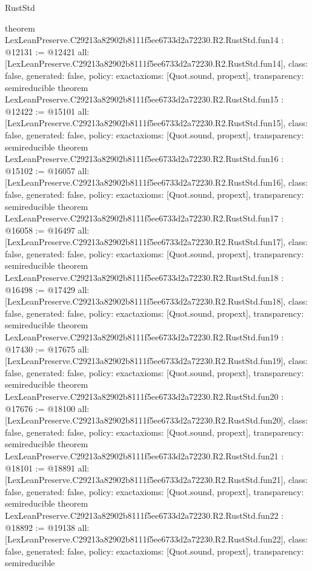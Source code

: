 \begin{lexlean}{RustStd}
\begin{coremodule}
{}
theorem LexLeanPreserve.C29213a82902b8111f5ee6733d2a72230.R2.RustStd.fun14 : @12131 := @12421 {
  all: [LexLeanPreserve.C29213a82902b8111f5ee6733d2a72230.R2.RustStd.fun14],
  class: false,
  generated: false,
  policy: exact{axioms: [Quot.sound, propext]},
  transparency: semireducible
}
theorem LexLeanPreserve.C29213a82902b8111f5ee6733d2a72230.R2.RustStd.fun15 : @12422 := @15101 {
  all: [LexLeanPreserve.C29213a82902b8111f5ee6733d2a72230.R2.RustStd.fun15],
  class: false,
  generated: false,
  policy: exact{axioms: [Quot.sound, propext]},
  transparency: semireducible
}
theorem LexLeanPreserve.C29213a82902b8111f5ee6733d2a72230.R2.RustStd.fun16 : @15102 := @16057 {
  all: [LexLeanPreserve.C29213a82902b8111f5ee6733d2a72230.R2.RustStd.fun16],
  class: false,
  generated: false,
  policy: exact{axioms: [Quot.sound, propext]},
  transparency: semireducible
}
theorem LexLeanPreserve.C29213a82902b8111f5ee6733d2a72230.R2.RustStd.fun17 : @16058 := @16497 {
  all: [LexLeanPreserve.C29213a82902b8111f5ee6733d2a72230.R2.RustStd.fun17],
  class: false,
  generated: false,
  policy: exact{axioms: [Quot.sound, propext]},
  transparency: semireducible
}
theorem LexLeanPreserve.C29213a82902b8111f5ee6733d2a72230.R2.RustStd.fun18 : @16498 := @17429 {
  all: [LexLeanPreserve.C29213a82902b8111f5ee6733d2a72230.R2.RustStd.fun18],
  class: false,
  generated: false,
  policy: exact{axioms: [Quot.sound, propext]},
  transparency: semireducible
}
theorem LexLeanPreserve.C29213a82902b8111f5ee6733d2a72230.R2.RustStd.fun19 : @17430 := @17675 {
  all: [LexLeanPreserve.C29213a82902b8111f5ee6733d2a72230.R2.RustStd.fun19],
  class: false,
  generated: false,
  policy: exact{axioms: [Quot.sound, propext]},
  transparency: semireducible
}
theorem LexLeanPreserve.C29213a82902b8111f5ee6733d2a72230.R2.RustStd.fun20 : @17676 := @18100 {
  all: [LexLeanPreserve.C29213a82902b8111f5ee6733d2a72230.R2.RustStd.fun20],
  class: false,
  generated: false,
  policy: exact{axioms: [Quot.sound, propext]},
  transparency: semireducible
}
theorem LexLeanPreserve.C29213a82902b8111f5ee6733d2a72230.R2.RustStd.fun21 : @18101 := @18891 {
  all: [LexLeanPreserve.C29213a82902b8111f5ee6733d2a72230.R2.RustStd.fun21],
  class: false,
  generated: false,
  policy: exact{axioms: [Quot.sound, propext]},
  transparency: semireducible
}
theorem LexLeanPreserve.C29213a82902b8111f5ee6733d2a72230.R2.RustStd.fun22 : @18892 := @19138 {
  all: [LexLeanPreserve.C29213a82902b8111f5ee6733d2a72230.R2.RustStd.fun22],
  class: false,
  generated: false,
  policy: exact{axioms: [Quot.sound, propext]},
  transparency: semireducible
}
\end{coremodule}
\end{lexlean}
